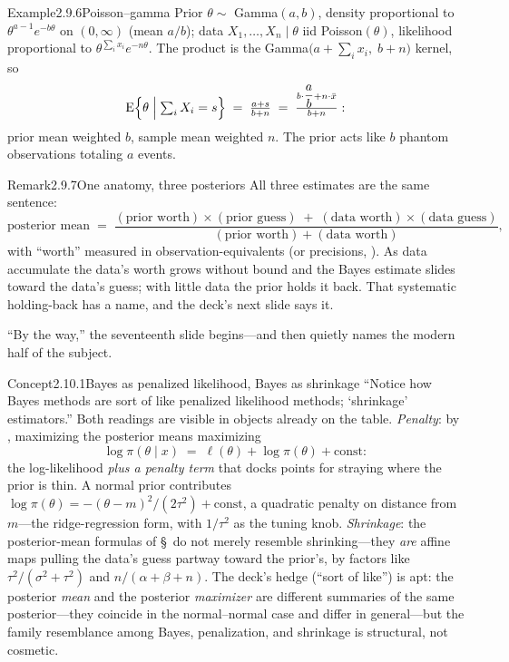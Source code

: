 \documentclass[main.tex]{subfiles}
\begin{document}
\begin{ObjL}{Example}{2.9.6}{Poisson--gamma}
Prior $\theta\sim$ Gamma$(a,b)$, density proportional to $\theta^{a-1}e^{-b\theta}$ on
$(0,\infty)$ (mean $a/b$); data $X_1,\dots,X_n\mid\theta$ iid Poisson$(\theta)$, likelihood
proportional to $\theta^{\sum_i x_i} e^{-n\theta}$. The product is the
Gamma$\big(a+\sum_i x_i,\; b+n\big)$ kernel, so
\[ \mathrm{E}\Big\{\theta \Bigm| \textstyle\sum_i X_i = s\Big\} \;=\; \frac{a+s}{b+n}
   \;=\; \frac{b\cdot\dfrac{a}{b} + n\cdot\bar x}{b+n} : \]
prior mean weighted $b$, sample mean weighted $n$. The prior acts like $b$ phantom
observations totaling $a$ events.
\end{ObjL}

\begin{ObjL}{Remark}{2.9.7}{One anatomy, three posteriors}
All three estimates are the same sentence:
\[ \text{posterior mean} \;=\;
   \frac{(\text{prior worth})\times(\text{prior guess})
   \;+\; (\text{data worth})\times(\text{data guess})}
   {(\text{prior worth}) + (\text{data worth})} , \]
with ``worth'' measured in observation-equivalents (or precisions, ). As data
accumulate the data's worth grows without bound and the Bayes estimate slides toward the
data's guess; with little data the prior holds it back. That systematic holding-back has a
name, and the deck's next slide says it.
\end{ObjL}


``By the way,'' the seventeenth slide begins---and then quietly names the modern half of the
subject.

\begin{ObjL}{Concept}{2.10.1}{Bayes as penalized likelihood, Bayes as shrinkage}
``Notice how Bayes methods are sort of like penalized likelihood methods; `shrinkage'
estimators.'' Both readings are visible in objects already on the table. \emph{Penalty}: by
, maximizing the posterior means maximizing
\[ \log \pi(\theta\mid x) \;=\; \ell(\theta) + \log\pi(\theta) + \text{const} : \]
the log-likelihood \emph{plus a penalty term} that docks points for straying where the prior
is thin. A normal prior contributes $\log\pi(\theta)=-(\theta-m)^2/(2\tau^2)+\text{const}$,
a quadratic penalty on distance from $m$---the ridge-regression form, with $1/\tau^2$ as
the tuning knob. \emph{Shrinkage}: the posterior-mean formulas of \S\, do not
merely resemble shrinking---they \emph{are} affine maps pulling the data's guess partway
toward the prior's, by factors like $\tau^2/(\sigma^2+\tau^2)$ and $n/(\alpha+\beta+n)$.
The deck's hedge (``sort of like'') is apt: the posterior \emph{mean} and the posterior
\emph{maximizer} are different summaries of the same posterior---they coincide in the
normal--normal case and differ in general---but the family resemblance among Bayes,
penalization, and shrinkage is structural, not cosmetic.
\end{ObjL}
\end{document}
